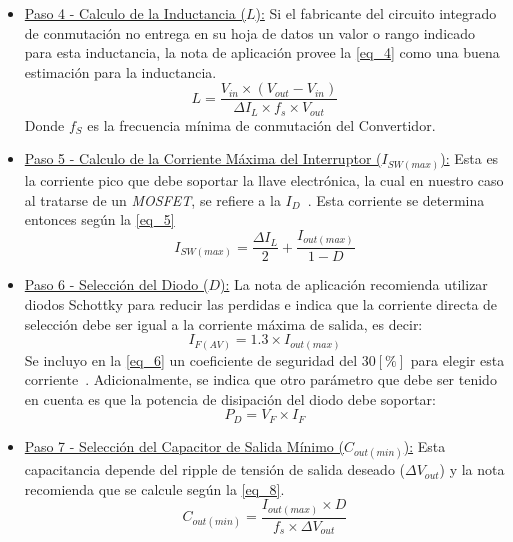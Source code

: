 \documentclass[12pt,a4paper]{article}
\begin{document}
\begin{itemize}
    \item \underline{Paso 4 - Calculo de la Inductancia ($L$):} Si el fabricante del circuito integrado de conmutación no entrega en su hoja de datos un valor o rango indicado para esta inductancia, la nota de aplicación provee la \autoref{eq_4} como una buena estimación para la inductancia.
    \begin{equation}
        L = \frac{V_{in} \times (V_{out} - V_{in})}{\Delta I_{L} \times f_{s} \times V_{out}}
        \label{eq_4}
    \end{equation}
    Donde $f_{S}$ es la frecuencia mínima de conmutación del Convertidor.


    \item \underline{Paso 5 - Calculo de la Corriente Máxima del Interruptor ($I_{SW(max)}$):} Esta es la corriente pico que debe soportar la llave electrónica, la cual en nuestro caso al tratarse de un \textit{MOSFET}, se refiere a la $I_{D}$~\cite{b6}. Esta corriente se determina entonces según la \autoref{eq_5}
    \begin{equation}
        I_{SW(max)} = \frac{\Delta I_{L}}{2} + \frac{I_{out(max)}}{1 - D}
        \label{eq_5}
    \end{equation}


    \item \underline{Paso 6 - Selección del Diodo ($D$):} La nota de aplicación recomienda utilizar
    diodos Schottky para reducir las perdidas e indica que la corriente directa de selección debe ser igual a la corriente máxima de salida, es decir:
    \begin{equation}
        I_{F(AV)} = 1.3 \times I_{out(max)}
        \label{eq_6}
    \end{equation}
    Se incluyo en la \autoref{eq_6} un coeficiente de seguridad del $30 [\%]$ para elegir esta corriente~\cite[Pág. 22]{b7}. Adicionalmente, se indica que otro parámetro que debe ser tenido en cuenta es que la potencia de disipación del diodo debe soportar:
    \begin{equation}
        P_{D} = V_{F} \times I_{F}
        \label{eq_7}
    \end{equation}
    

    \item \underline{Paso 7 - Selección del Capacitor de Salida Mínimo ($C_{out(min)}$):} Esta capacitancia depende del ripple de tensión de salida deseado ($\Delta V_{out}$) y la nota recomienda que se calcule según la \autoref{eq_8}.
    \begin{equation}
        C_{out(min)} = \frac{I_{out(max)} \times D}{f_{s} \times \Delta V_{out}}
        \label{eq_8}
    \end{equation}
\end{itemize}
\end{document}
